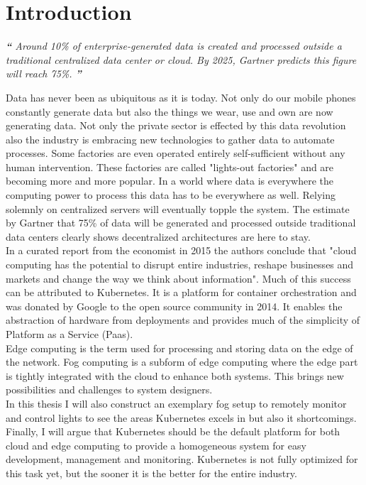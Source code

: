\section{Introduction}
\begin{displayquote}
\textit{\textbf{\Huge{``}}
\large{Around 10\% of enterprise-generated data is created and processed outside a traditional centralized data center or cloud. By 2025, Gartner predicts this figure will reach 75\%.\cite{gartnerEdgeComputing:online}}
\textbf{\Huge{''}}}
\\[1pt]
\end{displayquote}
Data has never been as ubiquitous as it is today. Not only do our mobile phones constantly generate data but also the things we wear, use and own are now generating data. Not only the private sector is effected by this data revolution also the industry is embracing new technologies to gather data to automate processes. Some factories are even operated entirely self-sufficient without any human intervention. These factories are called "lights-out factories" and are becoming more and more popular\cite{wheresmyRobotLightsOut33:online}. In a world where data is everywhere the computing power to process this data has to be everywhere as well. Relying solemnly on centralized servers will eventually topple the system. The estimate by Gartner that 75\% of data will be generated and processed outside traditional data centers clearly shows decentralized architectures are here to stay.\\
In a curated report from the economist in 2015 the authors conclude that "cloud computing has the potential to disrupt entire industries, reshape businesses and markets and change the way we think about information"\cite{PuttogetEconomistCloud13:online}. Much of this success can be attributed to Kubernetes. It is a platform for container orchestration and was donated by Google to the open source community in 2014\cite{WhatisKubernetes87:online}. It enables the abstraction of hardware from deployments and provides much of the simplicity of Platform as a Service (Paas).\\
Edge computing is the term used for processing and storing data on the edge of the network. Fog computing is a subform of edge computing where the edge part is tightly integrated with the cloud to enhance both systems. This brings new possibilities and challenges to system designers.\\
In this thesis I will also construct an exemplary fog setup to remotely monitor and control lights to see the areas Kubernetes excels in but also it shortcomings. Finally, I will argue that Kubernetes should be the default platform for both cloud and edge computing to provide a homogeneous system for easy development, management and monitoring. Kubernetes is not fully optimized for this task yet, but the sooner it is the better for the entire industry.



% 


% 

% 